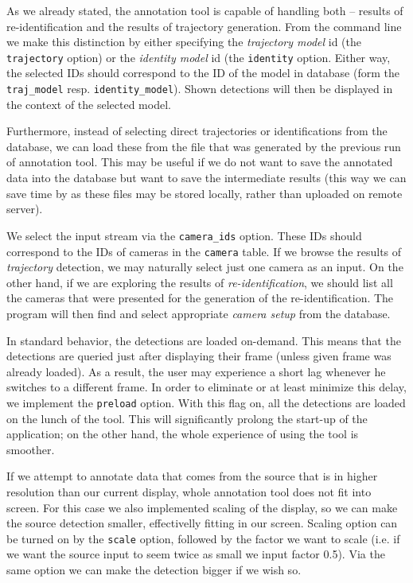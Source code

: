 As we already stated, the annotation tool is capable of handling both -- results of re-identification and the results of trajectory generation. From the command line we
make this distinction by either specifying the \emph{trajectory model} id (the
\texttt{\-\-trajectory} option) or the \emph{identity model} id (the
\texttt{\-\-identity} option. Either way, the selected IDs should correspond to the
ID of the model in database (form the \texttt{traj\_model} resp. 
\texttt{identity\_model}). Shown detections will then be displayed in the context
of the selected model.

Furthermore, instead of selecting direct trajectories or identifications from the
database, we can load these from the file that was generated by the previous run of
annotation tool. This may be useful if we do not want to save the annotated data
into the database but want to save the intermediate results (this way we can save
time by as these files may be stored locally, rather than uploaded on remote
server).

We select the input stream via the \texttt{\-\-camera\_ids} option. These IDs should
correspond to the IDs of cameras in the \texttt{camera} table. If we browse the
results of \emph{trajectory} detection, we may naturally select just one camera
as an input. On the other hand, if we are exploring the results of
\emph{re-identification}, we should list all the cameras that were presented
for the generation of the re-identification. The program will then find and select
appropriate \emph{camera setup} from the database.

In standard behavior, the detections are loaded on-demand. This means that the detections
are queried just after displaying their frame (unless given frame was already loaded).
As a result, the user may experience a short lag whenever he switches to a different frame.
In order to eliminate or at least minimize this delay, we implement the
\texttt{\-\-preload} option. With this flag on, all the detections are loaded on the
lunch of the tool. This will significantly prolong the start-up of the application; on the other hand, the whole experience of using the tool is smoother.

If we attempt to annotate data that comes from the source that is in higher resolution
than our current display, whole annotation tool does not fit into screen. For this case
we also implemented scaling of the display, so we can make the source detection smaller,
effectivelly fitting in our screen. Scaling option can be turned on by the
\texttt{\-\-scale} option, followed by the factor we want to scale (i.e. if we want the
source input to seem twice as small we input factor 0.5). Via the same option we can
make the detection bigger if we wish so.

